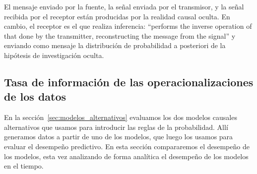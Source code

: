 \documentclass[a4paper,11pt]{book}
\theoremstyle{definition}
\begin{document}

El mensaje enviado por la fuente, la se\~nal enviada por el transmisor, y la se\~nal recibida por el receptor est\'an producidas por la realidad causal oculta.
%
En cambio, el receptor es el que realiza inferencia: ``performs the inverse operation of that done by the transmitter, reconstructing the message from the signal'' y enviando como mensaje la distribuci\'on de probabilidad a posteriori de la hip\'otesis de investigaci\'on oculta.



\subsection{Tasa de informaci\'on de las operacionalizaciones de los datos} \label{sec:tasa_de_informacion}

En la secci\'on~\ref{sec:modelos_alternativos} evaluamos los dos modelos causales alternativos que usamos para introducir las reglas de la probabilidad.
%
All\'i generamos datos a partir de uno de los modelos, que luego los usamos para evaluar el desempe\~no predictivo.
%
En esta secci\'on compararemos el desempe\~no de los modelos, esta vez analizando de forma anal\'itica el desempe\~no de los modelos en el tiempo.

\end{document}
